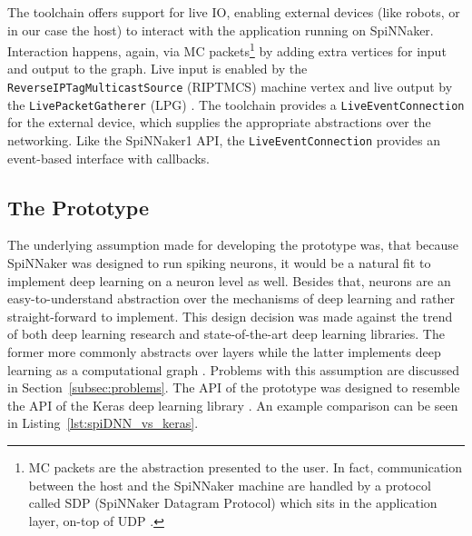 \documentclass[]{article}
\begin{document}
The toolchain offers support for live IO, enabling external devices
(like robots, or in our case the host) to interact with the
application running on SpiNNaker.
Interaction happens, again, via MC packets\footnote{%
  MC packets are the abstraction presented to the user. In fact,
  communication between the host and the SpiNNaker machine are handled
  by a protocol called SDP (SpiNNaker Datagram Protocol)
  which sits in the application layer, on-top of UDP
  \citep{furber_et_al_2014}.
}
by adding extra
vertices for input and output to the graph.
Live input is enabled by the \texttt{ReverseIPTagMulticastSource}
(RIPTMCS) machine vertex and live output by the
\texttt{LivePacketGatherer} (LPG) \citep{furber_et_al_2020}.
The toolchain provides a \texttt{LiveEventCon\-nection} for the
external device, which supplies the appropriate abstractions over the
networking.
Like the SpiNNaker1 API, the \texttt{Live\-Event\-Con\-nection}
provides an event-based interface with callbacks.



\subsection{The Prototype} %
\label{subsec:SpiDNN_arch}

The underlying assumption made for developing the prototype was,
that because SpiNNaker was designed to run spiking neurons, it would
be a natural fit to implement deep learning on a neuron level as well.
Besides that, neurons are an easy-to-understand abstraction over the
mechanisms of deep learning and rather straight-forward to implement.
This design decision was made against the trend of both deep learning
research and state-of-the-art deep learning libraries.
The former more commonly abstracts over layers while the latter
implements deep learning as a computational graph
\citep{goodfellow_et_al_2016}.
Problems with this assumption are discussed in
Section~\ref{subsec:problems}.
The API of the prototype was designed to resemble the API of the Keras
deep learning library \citep{keras}.
An example comparison can be seen in
Listing~\ref{lst:spiDNN_vs_keras}.
\end{document}
